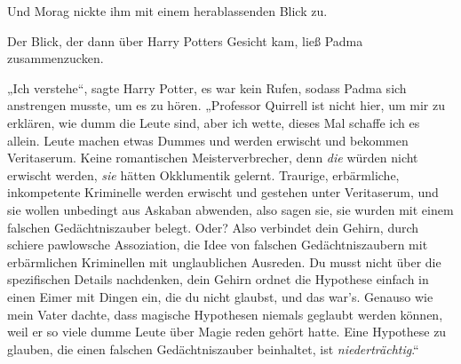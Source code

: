 Und Morag nickte ihm mit einem herablassenden Blick zu.

Der Blick, der dann über Harry Potters Gesicht kam, ließ Padma zusammenzucken.

„Ich verstehe“, sagte Harry Potter, es war kein Rufen, sodass Padma sich anstrengen musste, um es zu hören.
„Professor Quirrell ist nicht hier, um mir zu erklären, wie dumm die Leute sind, aber ich wette, dieses Mal schaffe ich es allein. Leute machen etwas Dummes und werden erwischt und bekommen Veritaserum. Keine romantischen Meisterverbrecher, denn \emph{die} würden nicht erwischt werden, \emph{sie} hätten Okklumentik gelernt. Traurige, erbärmliche, inkompetente Kriminelle werden erwischt und gestehen unter Veritaserum, und sie wollen unbedingt aus Askaban abwenden, also sagen sie, sie wurden mit einem falschen Gedächtniszauber belegt. Oder? Also verbindet dein Gehirn, durch schiere pawlowsche Assoziation, die Idee von falschen Gedächtniszaubern mit erbärmlichen Kriminellen mit unglaublichen Ausreden. Du musst nicht über die spezifischen Details nachdenken, dein Gehirn ordnet die Hypothese einfach in einen Eimer mit Dingen ein, die du nicht glaubst, und das war’s. Genauso wie mein Vater dachte, dass magische Hypothesen niemals geglaubt werden können, weil er so viele dumme Leute über Magie reden gehört hatte. Eine Hypothese zu glauben, die einen falschen Gedächtniszauber beinhaltet, ist \emph{niederträchtig}.“

